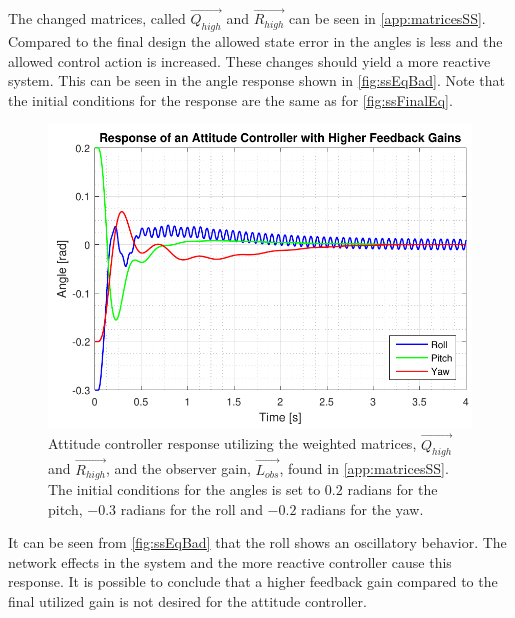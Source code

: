 The changed matrices, called $\vec{Q_{high}}$ and $\vec{R_{high}}$ can be seen in \autoref{app:matricesSS}. Compared to the final design the allowed state error in the angles is less and the allowed control action is increased. These changes should yield a more reactive system. This can be seen in the angle response shown in \autoref{fig:ssEqBad}. Note that the initial conditions for the response are the same as for \autoref{fig:ssFinalEq}.
%
\begin{figure}[H]
	\centering
	\includegraphics[scale=1]{figures/ssEqBad.pdf}
	\caption{Attitude controller response utilizing the weighted matrices, $\vec{Q_{high}}$ and $\vec{R_{high}}$, and the observer gain, $\vec{L_{obs}}$, found in \autoref{app:matricesSS}. The initial conditions for the angles is set to $0.2$ radians for the pitch, $-0.3$ radians for the roll and $-0.2$ radians for the yaw.}
	\label{fig:ssEqBad}
\end{figure}
%
It can be seen from \autoref{fig:ssEqBad} that the roll shows an oscillatory behavior. The network effects in the system and the more reactive controller cause this response.%
It is possible to conclude that a higher feedback gain compared to the final utilized gain is not desired for the attitude controller.

